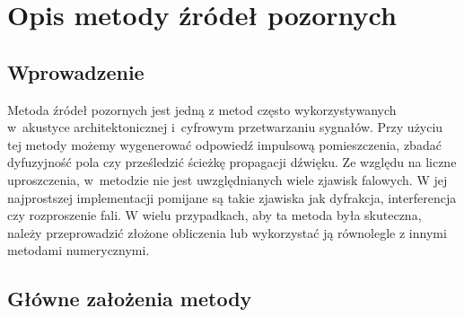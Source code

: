 \chapter{Opis metody źródeł pozornych}\label{cha:ims}


\section{Wprowadzenie}\label{sec:wprowadzenie}

Metoda źródeł pozornych jest jedną z metod często wykorzystywanych w~akustyce architektonicznej i~cyfrowym przetwarzaniu sygnałów. Przy użyciu tej metody możemy wygenerować odpowiedź impulsową pomieszczenia, zbadać dyfuzyjność pola  czy prześledzić ścieżkę propagacji dźwięku. Ze względu na liczne uproszczenia, w~metodzie nie jest uwzględnianych wiele zjawisk falowych. W jej najprostszej implementacji pomijane są takie zjawiska jak dyfrakcja, interferencja czy rozproszenie fali. W wielu przypadkach, aby ta metoda była skuteczna, należy przeprowadzić złożone obliczenia lub wykorzystać ją równolegle z innymi metodami numerycznymi.



\section{Główne założenia metody}\label{sec:gzm}

